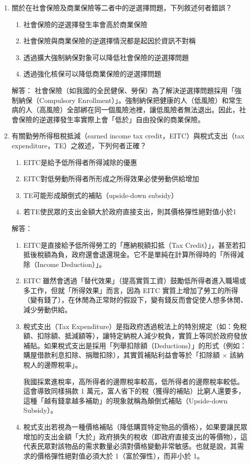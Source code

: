 \documentclass[12pt, a4paper]{article}
\begin{document}
\begin{enumerate}
    \item 關於在社會保險及商業保險等二者中的逆選擇問題，下列敘述何者錯誤？
    \begin{enumerate}[label=\Alph*.]
        \item 社會保險的逆選擇發生率會高於商業保險
        \item 社會保險與商業保險的逆選擇情況都是起因於資訊不對稱
        \item 透過擴大強制納保對象可以降低社會保險的逆選擇問題
        \item 透過強化核保可以降低商業保險的逆選擇問題
    \end{enumerate}
    解答：
    社會保險（如我國的全民健保、勞保）為了解決逆選擇問題採用「強制納保（Compulsory Enrollment）」。強制納保把健康的人（低風險）和常生病的人（高風險）全部綁在同一個風險池裡，讓低風險者無法退出。因此，社會保險的逆選擇發生率實際上會「低於」自由投保的商業保險。

    \item 有關勤勞所得租稅抵減（earned income tax credit，EITC）與稅式支出（tax expenditure，TE）之敘述，下列何者正確？
    \begin{enumerate}[label=\Alph*.]
        \item EITC是給予低所得者所得減除的優惠
        \item EITC對低勞動所得者所形成之所得效果必使勞動供給增加
        \item TE可能形成顛倒式的補貼（upside-down subsidy）
        \item 若TE使民眾的支出金額大於政府直接支出，則其價格彈性絕對值小於1
    \end{enumerate}
    解答：
    \begin{enumerate}[label=\Alph*.]
        \item EITC是直接給予低所得勞工的「應納稅額扣抵（Tax Credit）」，甚至若扣抵後稅額為負，政府還會退還現金。它不是單純在計算所得時的「所得減除（Income Deduction）」。
        \item EITC 雖然會透過「替代效果」（提高實質工資）鼓勵低所得者進入職場或多工作，但就「所得效果」而言，因為 EITC 實質上增加了勞工的所得（變有錢了），在休閒為正常財的假設下，變有錢反而會促使人想多休閒、減少勞動供給。
        \item 稅式支出（Tax Expenditure）是指政府透過稅法上的特別規定（如：免稅額、扣除額、抵減額等），讓特定納稅人減少稅負，實質上等同於政府發放補貼。如果稅式支出是採用「列舉扣除額（Deductions）」的形式（例如：購屋借款利息扣除、捐贈扣除），其實質補貼利益會等於「扣除額 × 該納稅人的邊際稅率」。

        我國採累進稅率，高所得者的邊際稅率較高，低所得者的邊際稅率較低。這會導致同樣捐款 1 萬元，富人省下的稅（獲得的補貼）比窮人還要多，這種「越有錢拿越多補助」的現象就稱為顛倒式補貼（Upside-down Subsidy）。
        \item 稅式支出若視為一種價格補貼（降低購買特定物品的價格），如果要讓民眾增加的支出金額「大於」政府損失的稅收（即政府直接支出的等價物），這代表民眾對該物品的需求數量必須對價格變動非常敏感。也就是說，其需求的價格彈性絕對值必須大於 1（富於彈性），而非小於 1。
    \end{enumerate}


\end{enumerate}
\end{document}
